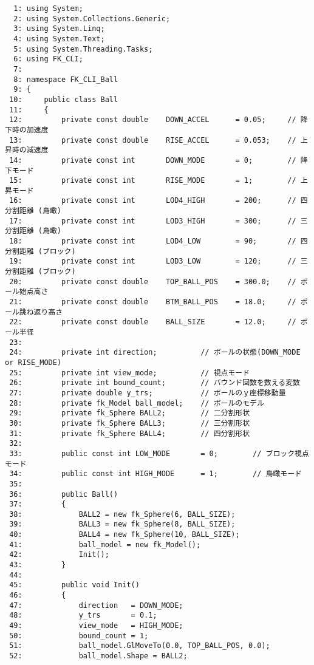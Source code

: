 \begin{breakbox}
\begin{small}
\begin{verbatim}
  1: using System;
  2: using System.Collections.Generic;
  3: using System.Linq;
  4: using System.Text;
  5: using System.Threading.Tasks;
  6: using FK_CLI;
  7: 
  8: namespace FK_CLI_Ball
  9: {
 10:     public class Ball
 11:     {
 12:         private const double    DOWN_ACCEL      = 0.05;     // 降下時の加速度
 13:         private const double    RISE_ACCEL      = 0.053;    // 上昇時の減速度
 14:         private const int       DOWN_MODE       = 0;        // 降下モード
 15:         private const int       RISE_MODE       = 1;        // 上昇モード
 16:         private const int       LOD4_HIGH       = 200;      // 四分割距離 (鳥瞰)
 17:         private const int       LOD3_HIGH       = 300;      // 三分割距離 (鳥瞰)
 18:         private const int       LOD4_LOW        = 90;       // 四分割距離 (ブロック)
 19:         private const int       LOD3_LOW        = 120;      // 三分割距離 (ブロック)
 20:         private const double    TOP_BALL_POS    = 300.0;    // ボール始点高さ
 21:         private const double    BTM_BALL_POS    = 18.0;     // ボール跳ね返り高さ
 22:         private const double    BALL_SIZE       = 12.0;     // ボール半径
 23: 
 24:         private int direction;          // ボールの状態(DOWN_MODE or RISE_MODE)
 25:         private int view_mode;          // 視点モード
 26:         private int bound_count;        // バウンド回数を数える変数
 27:         private double y_trs;           // ボールのｙ座標移動量
 28:         private fk_Model ball_model;    // ボールのモデル
 29:         private fk_Sphere BALL2;        // 二分割形状
 30:         private fk_Sphere BALL3;        // 三分割形状
 31:         private fk_Sphere BALL4;        // 四分割形状
 32: 
 33:         public const int LOW_MODE       = 0;        // ブロック視点モード
 34:         public const int HIGH_MODE      = 1;        // 鳥瞰モード
 35: 
 36:         public Ball()
 37:         {
 38:             BALL2 = new fk_Sphere(6, BALL_SIZE);
 39:             BALL3 = new fk_Sphere(8, BALL_SIZE);
 40:             BALL4 = new fk_Sphere(10, BALL_SIZE);
 41:             ball_model = new fk_Model();
 42:             Init();
 43:         }
 44: 
 45:         public void Init()
 46:         {
 47:             direction   = DOWN_MODE;
 48:             y_trs       = 0.1;
 49:             view_mode   = HIGH_MODE;
 50:             bound_count = 1;
 51:             ball_model.GlMoveTo(0.0, TOP_BALL_POS, 0.0);
 52:             ball_model.Shape = BALL2;

\end{verbatim}
\end{small}
\end{breakbox}
